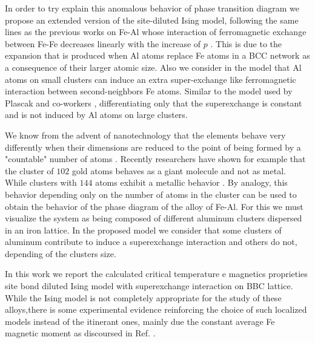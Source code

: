 \documentclass[twocolumn,5p,12pt]{elsarticle}
\begin{document}
	In order to try explain this anomalous behavior of phase transition diagram we propose an extended version of the site-diluted Ising model, following the same lines as the previous works on Fe-Al whose interaction of ferromagnetic exchange between Fe-Fe decreases linearly with the increase of $p$ \cite{x,x1,Plascak2000}. This is due to the expansion that is produced when Al atoms replace Fe atoms in a BCC network as a consequence of their larger atomic size. Also we consider in the model that Al atoms on small clusters can induce an extra super-exchange like ferromagnetic interaction between second-neighbors Fe atoms. Similar to the model used by Plascak and co-workers \cite{Plascak2000}, differentiating only that the superexchange is constant and is not induced by Al atoms on large clusters.

	We know from the advent of nanotechnology that the elements behave very differently when their dimensions are reduced to the point of being formed by a "countable" number of atoms \cite{Koch2006}. Recently researchers have shown for example that the cluster of $102$ gold atoms behaves as a giant molecule and not as metal. While clusters with $144$ atoms exhibit a metallic behavior \cite{Mustalahti2015}. By analogy, this behavior depending only on the number of atoms in the cluster can be used to obtain the behavior of the phase diagram of the alloy of Fe-Al. For this we must visualize the system as being composed of different aluminum clusters dispersed in an iron lattice. In the proposed model we consider that some clusters of aluminum contribute to induce a superexchange interaction and others do not, depending of the clusters size.

 	In this work we report the calculated critical temperature e magnetics proprieties site bond diluted Ising model with superexchange interaction on BBC lattice. While the Ising model is not completely appropriate for the study of these alloys,there is some experimental evidence reinforcing the choice of such localized models instead of the itinerant ones, mainly due the constant average Fe magnetic moment  as discoursed in Ref. \cite{Perez1986}.
\end{document}
